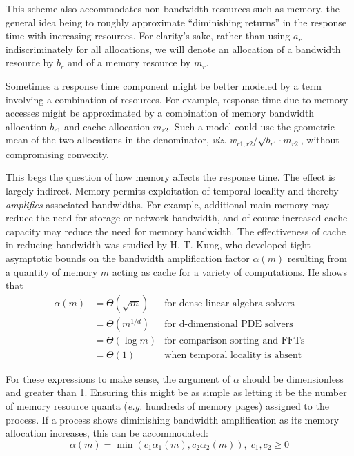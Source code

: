 This scheme also accommodates non-bandwidth resources such as memory,
the general idea being to roughly approximate ``diminishing returns'' in the response time with increasing resources.
For clarity's sake, rather than using $a_r$ indiscriminately for all allocations,
we will denote an allocation of a bandwidth resource by $b_r$ and of a memory resource by $m_r$.

Sometimes a response time component might be better modeled by a term involving a combination of resources.
For example, response time due to memory accesses might be approximated
by a combination of memory bandwidth allocation $b_{r1}$ and cache allocation $m_{r2}$.
Such a model could use the geometric mean of the two allocations in the denominator,
\emph{viz.} $w_{r1,r2}/\sqrt{b_{r1}\cdot m_{r2}}$, without compromising convexity.

This begs the question of how memory affects the response time.
The effect is largely indirect.
Memory permits exploitation of temporal locality and thereby \emph{amplifies} associated bandwidths.
For example, additional main memory may reduce the need for storage or network bandwidth,
and of course increased cache capacity may reduce the need for memory bandwidth.
The effectiveness of cache in reducing bandwidth was studied by
H. T. Kung\cite{Kung}, who developed tight asymptotic bounds on the bandwidth amplification
factor $\alpha(m)$ resulting from a quantity of memory $m$ acting as cache for a variety of computations.
He shows that
\begin{displaymath}
\begin{array}{lll}
\alpha(m) &= \Theta(\sqrt m) & \mbox{for dense linear algebra solvers} \\
          &= \Theta(m^{1/d}) & \mbox{for d-dimensional PDE solvers} \\
          &= \Theta(\log m)  & \mbox{for comparison sorting and FFTs} \\
          &= \Theta(1)       & \mbox{when temporal locality is absent}
\end{array}
\end{displaymath}

For these expressions to make sense, the argument of $\alpha$ should be dimensionless and greater than 1.
Ensuring this might be as simple as letting it be the number of memory resource quanta
(\emph{e.g.} hundreds of memory pages) assigned to the process.
If a process shows diminishing bandwidth amplification as its memory allocation increases, this can be accommodated:
\begin{displaymath}
\alpha(m) = \min(c_1\alpha_1(m),c_2\alpha_2(m)),\;c_1,c_2 \geq 0
\end{displaymath}

